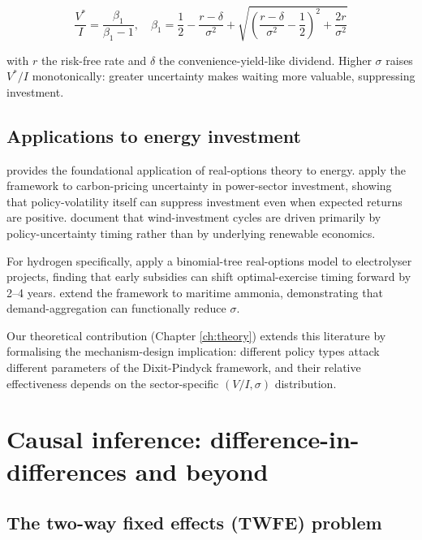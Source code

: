 \begin{equation}
\frac{V^*}{I} = \frac{\beta_1}{\beta_1 - 1}, \quad
\beta_1 = \frac{1}{2} - \frac{r-\delta}{\sigma^2}
       + \sqrt{\left(\frac{r-\delta}{\sigma^2} - \frac{1}{2}\right)^2 + \frac{2r}{\sigma^2}}
\label{eq:lit_dixit_pindyck}
\end{equation}

with $r$ the risk-free rate and $\delta$ the convenience-yield-like dividend. Higher $\sigma$ raises $V^*/I$ monotonically: greater uncertainty makes waiting more valuable, suppressing investment.

\subsection{Applications to energy investment}

\cite{pindyck1991irreversibility} provides the foundational application of real-options theory to energy. \cite{fuss2012impact} apply the framework to carbon-pricing uncertainty in power-sector investment, showing that policy-volatility itself can suppress investment even when expected returns are positive. \cite{barradale2014investing} document that wind-investment cycles are driven primarily by policy-uncertainty timing rather than by underlying renewable economics.

For hydrogen specifically, \cite{hosseini2022real} apply a binomial-tree real-options model to electrolyser projects, finding that early subsidies can shift optimal-exercise timing forward by 2--4 years. \cite{lloyd2022maritime} extend the framework to maritime ammonia, demonstrating that demand-aggregation can functionally reduce $\sigma$.

Our theoretical contribution (Chapter \ref{ch:theory}) extends this literature by formalising the mechanism-design implication: different policy types attack different parameters of the Dixit-Pindyck framework, and their relative effectiveness depends on the sector-specific $(V/I, \sigma)$ distribution.

\section{Causal inference: difference-in-differences and beyond}
\label{sec:lit_did}

\subsection{The two-way fixed effects (TWFE) problem}

